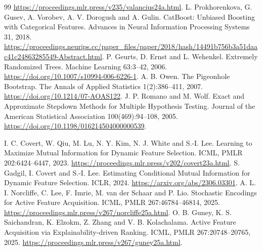 \documentclass[11pt]{article}
\begin{document}
\begin{thebibliography}{99}
\url{https://proceedings.mlr.press/v235/valancius24a.html}.
 L. Prokhorenkova, G. Gusev, A. Vorobev, A. V. Dorogush and A. Gulin.
CatBoost: Unbiased Boosting with Categorical Features.
Advances in Neural Information Processing Systems 31, 2018.
\url{https://proceedings.neurips.cc/paper_files/paper/2018/hash/14491b756b3a51daac41c24863285549-Abstract.html}.
 P. Geurts, D. Ernst and L. Wehenkel.
Extremely Randomized Trees. Machine Learning 63:3--42, 2006.
\url{https://doi.org/10.1007/s10994-006-6226-1}.
 A. B. Owen. The Pigeonhole Bootstrap.
The Annals of Applied Statistics 1(2):386--411, 2007.
\url{https://doi.org/10.1214/07-AOAS122}.
 J. P. Romano and M. Wolf. Exact and Approximate Stepdown
Methods for Multiple Hypothesis Testing. Journal of the American Statistical
Association 100(469):94--108, 2005.
\url{https://doi.org/10.1198/016214504000000539}.

 I. C. Covert, W. Qiu, M. Lu, N. Y. Kim, N. J. White and S.-I. Lee.
Learning to Maximize Mutual Information for Dynamic Feature Selection.
ICML, PMLR 202:6424--6447, 2023.
\url{https://proceedings.mlr.press/v202/covert23a.html}.
 S. Gadgil, I. Covert and S.-I. Lee.
Estimating Conditional Mutual Information for Dynamic Feature Selection.
ICLR, 2024. \url{https://arxiv.org/abs/2306.03301}.
 A. L. I. Norcliffe, C. Lee, F. Imrie, M. van der Schaar and P. Lio.
Stochastic Encodings for Active Feature Acquisition.
ICML, PMLR 267:46784--46814, 2025.
\url{https://proceedings.mlr.press/v267/norcliffe25a.html}.
 O. B. Guney, K. S. Saichandran, K. Elzokm, Z. Zhang and V. B. Kolachalama.
Active Feature Acquisition via Explainability-driven Ranking.
ICML, PMLR 267:20748--20765, 2025.
\url{https://proceedings.mlr.press/v267/guney25a.html}.
\end{thebibliography}
\endgroup
\end{document}
